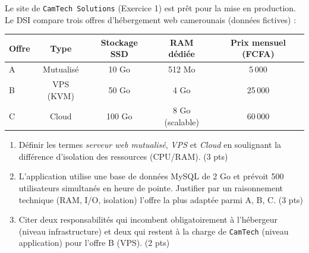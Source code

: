 \documentclass[11pt]{article}
\begin{document}
\begin{exercice}
Le site de \texttt{CamTech Solutions} (Exercice 1) est prêt pour la mise en production. Le DSI compare trois offres d'hébergement web camerounais (données fictives) :

\begin{center}
\begin{tabular}{|l|c|c|c|c|}
\hline
\textbf{Offre} & \textbf{Type} & \textbf{Stockage SSD} & \textbf{RAM dédiée} & \textbf{Prix mensuel (FCFA)} \\
\hline
A & Mutualisé & 10 Go & 512 Mo & 5\,000 \\
B & VPS (KVM) & 50 Go & 4 Go & 25\,000 \\
C & Cloud & 100 Go & 8 Go (scalable) & 60\,000 \\
\hline
\end{tabular}
\end{center}

\begin{enumerate}
    \item Définir les termes \textit{serveur web mutualisé}, \textit{VPS} et \textit{Cloud} en soulignant la différence d'isolation des ressources (CPU/RAM). (3 pts)
    \item L'application utilise une base de données MySQL de 2 Go et prévoit 500 utilisateurs simultanés en heure de pointe. Justifier par un raisonnement technique (RAM, I/O, isolation) l'offre la plus adaptée parmi A, B, C. (3 pts)
    \item Citer deux responsabilités qui incombent obligatoirement à l'hébergeur (niveau infrastructure) et deux qui restent à la charge de \texttt{CamTech} (niveau application) pour l'offre B (VPS). (2 pts)
\end{enumerate}
\end{exercice}
\end{document}
